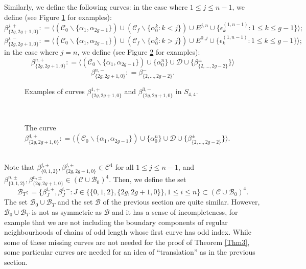 \documentclass[twoside,11pt,a4paper]{article}
\newcommand*{\Cf}{\mathscr{C}}
\newcommand*{\Cfn}{\Cf_{0}}
\newcommand*{\Cff}{\Cf_{f}}
\newcommand*{\Bf}{\mathscr{B}}
\newcommand*{\Bfn}{\Bf_{0}}
\newcommand*{\Df}{\mathscr{D}}
\newcommand*{\epsp}[3]{\epsilon_{#1}^{(#2,#3)}}
\newcommand*{\ColonEqq}{\mathrel{\mathop:}=}
\begin{document}
\indent Similarly, we define the following curves: in the case where $1 \leq j \leq n-1$, we define (see Figure \ref{ExamplesBetaT2} for examples): $$\beta_{\{2g,2g+1,0\}}^{j,+} \ColonEqq \langle(\Cfn \backslash \{\alpha_{1}, \alpha_{2g-1}\}) \cup (\Cff \backslash \{\alpha_{0}^{k} : k < j\}) \cup E^{j,n} \cup \{\epsp{k}{1}{n-1} : 1 \leq k \leq g-1\}\rangle;$$
$$\beta_{\{2g,2g+1,0\}}^{j,-} \ColonEqq \langle(\Cfn \backslash \{\alpha_{1},\alpha_{2g-1}\}) \cup (\Cff \backslash \{\alpha_{0}^{k} : k > j\}) \cup E^{0,j} \cup \{\epsp{k}{1}{n-1} : 1 \leq k \leq g-1\}\rangle;$$
in the case where $j = n$, we define (see Figure \ref{DefBeta2g2gplus10} for examples): $$\beta_{\{2g,2g+1,0\}}^{n,+} \ColonEqq \langle (\Cfn \backslash \{\alpha_{1}, \alpha_{2g-1}\}) \cup \{\alpha_{0}^{n}\} \cup \Df \cup \{\beta_{\{2, \ldots, 2g-2\}}^{\pm}\}\rangle$$
$$\beta_{\{2g,2g+1,0\}}^{n,-} \ColonEqq \beta_{\{2, \ldots, 2g-2\}}^{-}.$$
\begin{figure}[h]
 \begin{center}
  \resizebox{10cm}{!}{} \caption{Examples of curves $\beta_{\{2g,2g+1,0\}}^{1,+}$ and $\beta_{\{2g,2g+1,0\}}^{3,-}$ in $S_{4,4}$.}\label{ExamplesBetaT2}
 \end{center}
\end{figure}
\begin{figure}[h]
 \begin{center}
  \resizebox{10cm}{!}{}\\[0.3cm]
  \resizebox{10cm}{!}{} \caption{The curve $\beta_{\{2g,2g+1,0\}}^{4,+} \ColonEqq \langle (\Cfn \backslash \{\alpha_{1}, \alpha_{2g-1}\}) \cup \{\alpha_{0}^{n}\} \cup \Df \cup \{\beta_{\{2, \ldots, 2g-2\}}^{\pm}\}\rangle$.} \label{DefBeta2g2gplus10}
 \end{center}
\end{figure}\\
\indent Note that $\beta_{\{0,1,2\}}^{j,\pm}, \beta_{\{2g,2g+1,0\}}^{j,\pm} \in \Cf^{4}$ for all $1 \leq j \leq n-1$, and $\beta_{\{0,1,2\}}^{n,\pm}, \beta_{\{2g,2g+1,0\}}^{n, \pm} \in (\Cf \cup \Bfn)^{4}$. Then, we define the set $$\Bf_{T} \ColonEqq \{\beta_{J}^{i, +}, \beta_{J}^{i,-} : J \in \{ \{0,1,2\},\{2g,2g+1,0\}\}, 1 \leq i \leq n\} \subset (\Cf \cup \Bfn)^{4}.$$
\indent The set $\Bf_{0} \cup \Bf_{T}$ and the set $\Bf$ of the previous section are quite similar. However, $\Bf_{0} \cup \Bf_{T}$ is not as symmetric as $\Bf$ and it has a sense of incompleteness, for example that we are not including the boundary components of regular neighbourhoods of chains of odd length whose first curve has odd index. While some of these missing curves are not needed for the proof of Theorem \ref{Thm3}, some particular curves are needed for an idea of ``translation'' as in the previous section.
\end{document}
